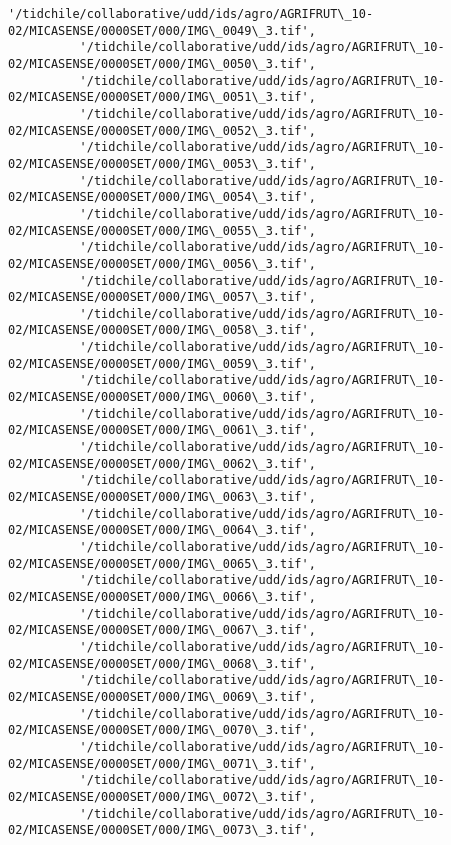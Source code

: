 \documentclass[11pt]{article}
\begin{document}
\begin{Verbatim}[commandchars=\\\{\}]
          '/tidchile/collaborative/udd/ids/agro/AGRIFRUT\_10-02/MICASENSE/0000SET/000/IMG\_0049\_3.tif',
          '/tidchile/collaborative/udd/ids/agro/AGRIFRUT\_10-02/MICASENSE/0000SET/000/IMG\_0050\_3.tif',
          '/tidchile/collaborative/udd/ids/agro/AGRIFRUT\_10-02/MICASENSE/0000SET/000/IMG\_0051\_3.tif',
          '/tidchile/collaborative/udd/ids/agro/AGRIFRUT\_10-02/MICASENSE/0000SET/000/IMG\_0052\_3.tif',
          '/tidchile/collaborative/udd/ids/agro/AGRIFRUT\_10-02/MICASENSE/0000SET/000/IMG\_0053\_3.tif',
          '/tidchile/collaborative/udd/ids/agro/AGRIFRUT\_10-02/MICASENSE/0000SET/000/IMG\_0054\_3.tif',
          '/tidchile/collaborative/udd/ids/agro/AGRIFRUT\_10-02/MICASENSE/0000SET/000/IMG\_0055\_3.tif',
          '/tidchile/collaborative/udd/ids/agro/AGRIFRUT\_10-02/MICASENSE/0000SET/000/IMG\_0056\_3.tif',
          '/tidchile/collaborative/udd/ids/agro/AGRIFRUT\_10-02/MICASENSE/0000SET/000/IMG\_0057\_3.tif',
          '/tidchile/collaborative/udd/ids/agro/AGRIFRUT\_10-02/MICASENSE/0000SET/000/IMG\_0058\_3.tif',
          '/tidchile/collaborative/udd/ids/agro/AGRIFRUT\_10-02/MICASENSE/0000SET/000/IMG\_0059\_3.tif',
          '/tidchile/collaborative/udd/ids/agro/AGRIFRUT\_10-02/MICASENSE/0000SET/000/IMG\_0060\_3.tif',
          '/tidchile/collaborative/udd/ids/agro/AGRIFRUT\_10-02/MICASENSE/0000SET/000/IMG\_0061\_3.tif',
          '/tidchile/collaborative/udd/ids/agro/AGRIFRUT\_10-02/MICASENSE/0000SET/000/IMG\_0062\_3.tif',
          '/tidchile/collaborative/udd/ids/agro/AGRIFRUT\_10-02/MICASENSE/0000SET/000/IMG\_0063\_3.tif',
          '/tidchile/collaborative/udd/ids/agro/AGRIFRUT\_10-02/MICASENSE/0000SET/000/IMG\_0064\_3.tif',
          '/tidchile/collaborative/udd/ids/agro/AGRIFRUT\_10-02/MICASENSE/0000SET/000/IMG\_0065\_3.tif',
          '/tidchile/collaborative/udd/ids/agro/AGRIFRUT\_10-02/MICASENSE/0000SET/000/IMG\_0066\_3.tif',
          '/tidchile/collaborative/udd/ids/agro/AGRIFRUT\_10-02/MICASENSE/0000SET/000/IMG\_0067\_3.tif',
          '/tidchile/collaborative/udd/ids/agro/AGRIFRUT\_10-02/MICASENSE/0000SET/000/IMG\_0068\_3.tif',
          '/tidchile/collaborative/udd/ids/agro/AGRIFRUT\_10-02/MICASENSE/0000SET/000/IMG\_0069\_3.tif',
          '/tidchile/collaborative/udd/ids/agro/AGRIFRUT\_10-02/MICASENSE/0000SET/000/IMG\_0070\_3.tif',
          '/tidchile/collaborative/udd/ids/agro/AGRIFRUT\_10-02/MICASENSE/0000SET/000/IMG\_0071\_3.tif',
          '/tidchile/collaborative/udd/ids/agro/AGRIFRUT\_10-02/MICASENSE/0000SET/000/IMG\_0072\_3.tif',
          '/tidchile/collaborative/udd/ids/agro/AGRIFRUT\_10-02/MICASENSE/0000SET/000/IMG\_0073\_3.tif',

\end{Verbatim}
\end{document}
